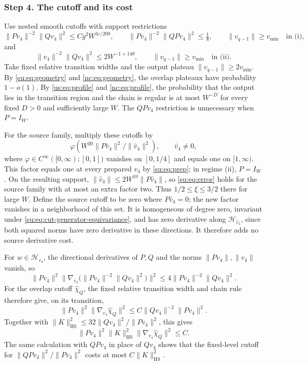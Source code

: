 \documentclass[11pt]{article}
\numberwithin{equation}{section}
\theoremstyle{remark}
\newcommand{\HS}{\mathrm{HS}}
\begin{document}
\subsubsection{Step 4. The cutoff and its cost}
\label{su:sec:cutoff-estimates}
\label{su:par:common-cutoffs}

Use nested smooth cutoffs with support restrictions
\begin{equation}\label{su:eq:cuts}
 \|Pv_4\|^{-2} \|Qv_4\|^2\le Cg^2W^{3\varepsilon/200},\qquad
 \|Pv_4\|^{-2} \|QPv_4\|^2\le\tfrac18,\qquad
 \|v_{q-1}\|\ge v_{\min}\quad\text{in (i)},
\end{equation}
and
\begin{equation}\label{nc:eq:sourcecuts}
 \|v_4\|^{-2} \|Qv_4\|^2\le2W^{-1+14\theta},\qquad
 \|v_{q-1}\|\ge v_{\min}\quad\text{in (ii)}.
\end{equation}
Take fixed relative transition widths and the output plateau
$\|v_{q-1}\|\ge2v_{\min}$. By \eqref{su:eq:geometry} and
\eqref{nc:eq:geometry}, the overlap plateaux have probability $1-o(1)$.
By \eqref{us:eq:profile} and \eqref{nc:eq:profile}, the probability
that the output lies in the transition region and the chain is regular is
at most $W^{-D}$ for every fixed $D>0$ and sufficiently large $W$.
The $QPv_4$ restriction is unnecessary when $P=I_W$.

For the source family, multiply these cutoffs by
\[
 \varphi\!\left(W^{20}\|P\widehat v_4\|^2/\|\widehat v_4\|^2\right),
 \qquad \widehat v_4\ne0,
\]
where $\varphi\in C^\infty([0,\infty);[0,1])$ vanishes on $[0,1/4]$
and equals one on $[1,\infty)$. This factor equals one at every
prepared $v_4$ by \eqref{su:eq:prep}; in regime (ii), $P=I_W$.
On the resulting support, $\|\widehat v_4\|\le2W^{10}\|P\widehat v_4\|$, so
\eqref{su:eq:error} holds for the source family with at most an extra
factor two. Thus $1/2\le\xi\le3/2$ there for large $W$.
Define the source cutoff to be zero where $P\widehat v_4=0$;
the new factor vanishes in a neighborhood of this set.
It is homogeneous of degree zero, invariant under
\eqref{su:eq:cut-generator-equivariance}, and has zero derivative along
$\mathcal H_{\widehat v_4}$, since both squared norms have zero derivative
in these directions. It therefore adds no source derivative cost.

For $w\in\mathcal H_{v_4}$, the directional derivatives of
$P,Q$ and the norms $\|Pv_4\|,\|v_4\|$ vanish, so
\[
 \|Pv_4\|^2\bigl\|\nabla_{v_4}
       \bigl(\|Pv_4\|^{-2}\|Qv_4\|^2\bigr)\bigr\|^2
 \le4\|Pv_4\|^{-2}\|Qv_4\|^2.
\]
For the overlap cutoff $\widehat\chi_Q$, the fixed relative transition
width and chain rule therefore give, on its transition,
\[
 \|Pv_4\|^2\|\nabla_{v_4}\widehat\chi_Q\|^2
 \le C\|Qv_4\|^{-2} \|Pv_4\|^2.
\]
Together with $\|K\|_{\HS}^2\le32\|Qv_4\|^2/\|Pv_4\|^2$, this gives
\begin{equation}\label{su:eq:common-overlap-cutoff-cost}
 \|Pv_4\|^2\|K\|_{\HS}^2
       \|\nabla_{v_4}\widehat\chi_Q\|^2\le C.
\end{equation}
The same calculation with $QPv_4$ in place of $Qv_4$ shows that the
fixed-level cutoff for $\|QPv_4\|^2/\|Pv_4\|^2$ costs at most
$C\|K\|_{\HS}^2$.
\end{document}
